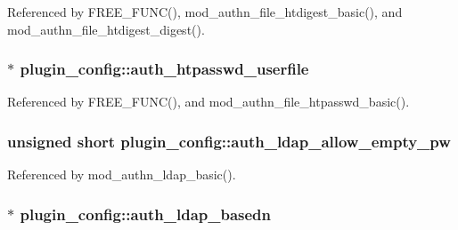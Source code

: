 Referenced by F\-R\-E\-E\-\_\-\-F\-U\-N\-C(), mod\-\_\-authn\-\_\-file\-\_\-htdigest\-\_\-basic(), and mod\-\_\-authn\-\_\-file\-\_\-htdigest\-\_\-digest().

\hypertarget{structplugin__config_a5913215a08368ee9f6e876bf0dcb034a}{
\subsubsection[{auth\-\_\-htpasswd\-\_\-userfile}]{$\ast$ plugin\-\_\-config\-::auth\-\_\-htpasswd\-\_\-userfile}}\label{structplugin__config_a5913215a08368ee9f6e876bf0dcb034a}


Referenced by F\-R\-E\-E\-\_\-\-F\-U\-N\-C(), and mod\-\_\-authn\-\_\-file\-\_\-htpasswd\-\_\-basic().

\hypertarget{structplugin__config_a60843f9797c3e38e5ad89d9d899095fe}{
\subsubsection[{auth\-\_\-ldap\-\_\-allow\-\_\-empty\-\_\-pw}]{\setlength{\rightskip}{0pt plus 5cm}unsigned short plugin\-\_\-config\-::auth\-\_\-ldap\-\_\-allow\-\_\-empty\-\_\-pw}}\label{structplugin__config_a60843f9797c3e38e5ad89d9d899095fe}


Referenced by mod\-\_\-authn\-\_\-ldap\-\_\-basic().

\hypertarget{structplugin__config_a1f4fae4ce75b39a02e476aafaa468465}{
\subsubsection[{auth\-\_\-ldap\-\_\-basedn}]{$\ast$ plugin\-\_\-config\-::auth\-\_\-ldap\-\_\-basedn}}\label{structplugin__config_a1f4fae4ce75b39a02e476aafaa468465}



